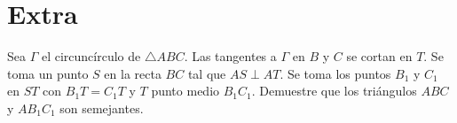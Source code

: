 \section{Extra}

\begin{section-problem}
    Sea $\Gamma$ el circuncírculo de $\triangle ABC$.
    Las tangentes a $\Gamma$ en $B$ y $C$ se cortan en $T$.
    Se toma un punto $S$ en la recta $BC$ tal que $AS \perp AT$.
    Se toma los puntos $B_1$ y $C_1$ en $ST$ con $B_1 T = C_1 T$ y $T$ punto medio $B_1 C_1$.
    Demuestre que los triángulos $ABC$ y $AB_1 C_1$ son semejantes.
\end{section-problem}